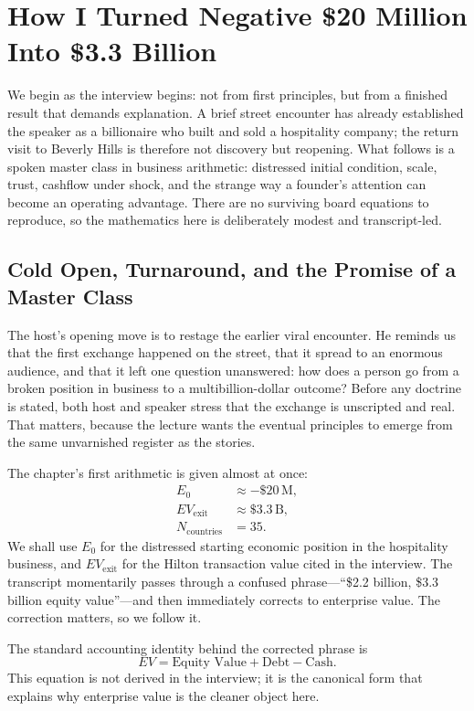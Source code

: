 \chapter{How I Turned Negative \$20 Million Into \$3.3 Billion}

We begin as the interview begins: not from first principles, but from a finished result that demands explanation. A brief street encounter has already established the speaker as a billionaire who built and sold a hospitality company; the return visit to Beverly Hills is therefore not discovery but reopening. What follows is a spoken master class in business arithmetic: distressed initial condition, scale, trust, cashflow under shock, and the strange way a founder's attention can become an operating advantage. There are no surviving board equations to reproduce, so the mathematics here is deliberately modest and transcript-led.

\section{Cold Open, Turnaround, and the Promise of a Master Class}

The host's opening move is to restage the earlier viral encounter. He reminds us that the first exchange happened on the street, that it spread to an enormous audience, and that it left one question unanswered: how does a person go from a broken position in business to a multibillion-dollar outcome? Before any doctrine is stated, both host and speaker stress that the exchange is unscripted and real. That matters, because the lecture wants the eventual principles to emerge from the same unvarnished register as the stories.

The chapter's first arithmetic is given almost at once:
\begin{align}
E_0 &\approx -\$20\,\mathrm{M},\\
EV_{\mathrm{exit}} &\approx \$3.3\,\mathrm{B},\\
N_{\mathrm{countries}} &= 35.
\end{align}
We shall use \(E_0\) for the distressed starting economic position in the hospitality business, and \(EV_{\mathrm{exit}}\) for the Hilton transaction value cited in the interview. The transcript momentarily passes through a confused phrase---``\$2.2 billion, \$3.3 billion equity value''---and then immediately corrects to enterprise value. The correction matters, so we follow it.

\begin{definition}
The standard accounting identity behind the corrected phrase is
\begin{equation}
EV=\text{Equity Value}+\text{Debt}-\text{Cash}.
\end{equation}
This equation is not derived in the interview; it is the canonical form that explains why enterprise value is the cleaner object here.
\end{definition}

